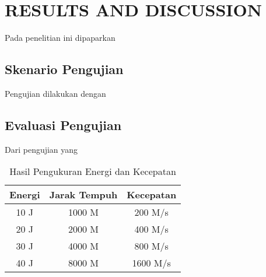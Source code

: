 \chapter{RESULTS AND DISCUSSION}
\label{chap:resultsandiscussion}


Pada penelitian ini dipaparkan \lipsum[1][1-5]

\section{Skenario Pengujian}
\label{sec:skenariopengujian}

Pengujian dilakukan dengan \lipsum[1-2]

\section{Evaluasi Pengujian}
\label{sec:analisispengujian}

Dari pengujian yang \lipsum[1]

\begin{longtable}{|c|c|c|}
  \caption{Hasil Pengukuran Energi dan Kecepatan}
  \label{tb:EnergiKecepatan}                                   \\
  \hline
  \rowcolor[HTML]{C0C0C0}
  \textbf{Energi} & \textbf{Jarak Tempuh} & \textbf{Kecepatan} \\
  \hline
  10 J            & 1000 M                & 200 M/s            \\
  20 J            & 2000 M                & 400 M/s            \\
  30 J            & 4000 M                & 800 M/s            \\
  40 J            & 8000 M                & 1600 M/s           \\
  \hline
\end{longtable}

\lipsum[2-4]
